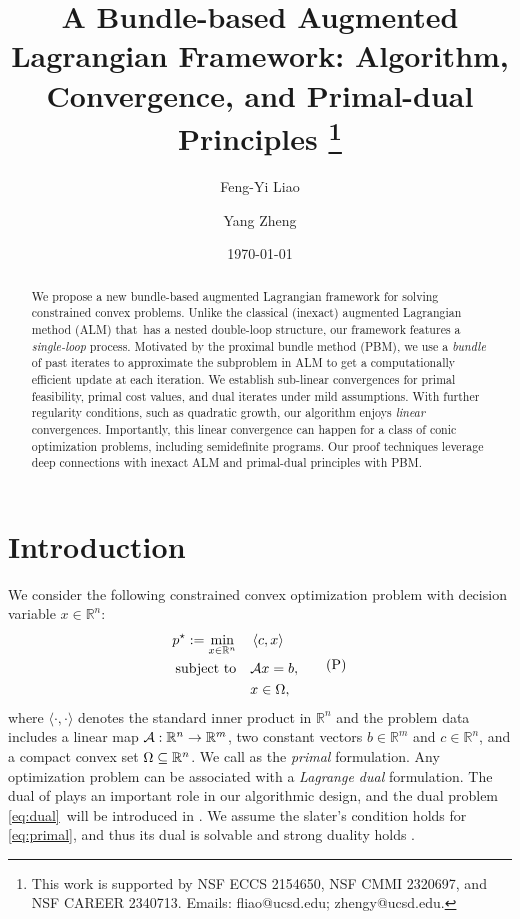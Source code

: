 \documentclass[11pt]{article}
\begin{document}
\title{
 \bf \Large A Bundle-based Augmented Lagrangian Framework: Algorithm,  Convergence, and Primal-dual Principles
\thanks{This work is supported by NSF ECCS 2154650, NSF CMMI 2320697, and NSF CAREER 2340713. Emails: fliao@ucsd.edu; zhengy@ucsd.edu. } 
}
\author[1]{Feng-Yi Liao}
\author[1]{Yang Zheng}
\date{\small \today \vspace{-5ex}} 

\maketitle

\begin{abstract}
    We propose a new bundle-based augmented Lagrangian framework for solving constrained convex problems. Unlike the classical (inexact) augmented Lagrangian method (ALM) that~has a nested double-loop structure, our framework features a \textit{single-loop} process. Motivated by the proximal bundle method (PBM), we use a \textit{bundle} of past iterates to approximate the subproblem in ALM to get a computationally efficient update at each iteration. We establish sub-linear convergences for primal feasibility, primal cost values, and dual iterates under mild assumptions. With further regularity conditions, such as quadratic growth, our algorithm enjoys \textit{linear} convergences. Importantly, this linear convergence can happen for a class of conic optimization problems, including semidefinite programs. Our proof techniques leverage deep connections with inexact ALM and primal-dual principles with PBM.   
\end{abstract}

\section{Introduction}
We consider the following constrained convex optimization problem with decision variable $x \in \mathbb{R}^n$:  
\begin{equation}
    \label{eq:primal}
    \begin{aligned}
        p^\star := \min_{x \in \mathbb{R}^n} & \quad \left \langle c, x \right\rangle\\ \mathrm{subject~to} & \quad \mathcal{A} x = b, \\
        & \quad  x \in \Omega,
    \end{aligned}
    \tag{P}
\end{equation}
where $\langle \cdot, \cdot \rangle$ denotes the standard inner product in $\mathbb{R}^n$ and the problem data includes a linear map $\mathcal{A}:\mathbb{R}^n \to \mathbb{R}^m$, two constant vectors $b \in \mathbb{R}^m$ and $c \in \mathbb{R}^n$, and a compact convex set $\Omega \subseteq \mathbb{R}^n$. We call  as the \textit{primal} formulation. Any optimization problem can be associated with a \textit{Lagrange dual} formulation. The dual of  plays an important role in our algorithmic design, and the dual problem \cref{eq:dual}~will be introduced in . 
{We assume the slater's condition holds for \cref{eq:primal}, and thus its dual is solvable and strong duality holds \cite[Section 5.2.3]{boyd2004convex}.}
\end{document}
